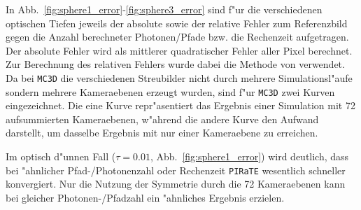 	
	In Abb.~\ref{fig:sphere1_error}-\ref{fig:sphere3_error} sind f"ur die verschiedenen optischen Tiefen jeweils der absolute sowie der relative Fehler zum Referenzbild gegen die Anzahl berechneter Photonen/Pfade bzw. die Rechenzeit aufgetragen. Der absolute Fehler wird als mittlerer quadratischer Fehler aller Pixel berechnet. Zur Berechnung des relativen Fehlers wurde dabei die Methode von \citet{Pryce:1984p13059} verwendet. Da bei \texttt{MC3D} die verschiedenen Streubilder nicht durch mehrere Simulationsl"aufe sondern mehrere Kameraebenen erzeugt wurden, sind f"ur \texttt{MC3D} zwei Kurven eingezeichnet. Die eine Kurve repr"asentiert das Ergebnis einer Simulation mit 72 aufsummierten Kameraebenen, w"ahrend die andere Kurve den Aufwand darstellt, um dasselbe Ergebnis mit nur einer Kameraebene zu erreichen.
	
	Im optisch d"unnen Fall ($\tau=0.01$, Abb.~\ref{fig:sphere1_error}) wird deutlich, dass bei "ahnlicher Pfad-/Photonenzahl oder Rechenzeit \texttt{PIRaTE} wesentlich schneller konvergiert. Nur die Nutzung der Symmetrie durch die 72 Kameraebenen kann bei gleicher Photonen-/Pfadzahl ein "ahnliches Ergebnis erzielen. 
	
